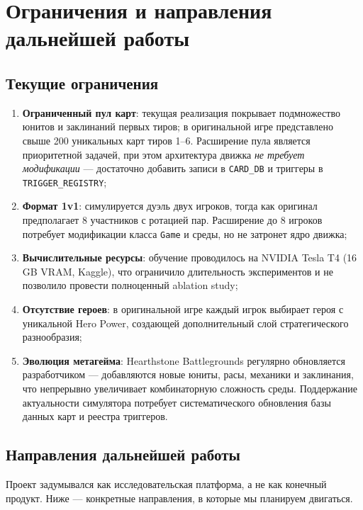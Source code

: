 \documentclass[a4paper,12pt]{extarticle}
\begin{document}
\newpage

\section{Ограничения и направления дальнейшей работы}

\subsection{Текущие ограничения}

\begin{enumerate}[noitemsep]
  \item \textbf{Ограниченный пул карт}: текущая реализация покрывает подмножество юнитов и заклинаний первых тиров; в оригинальной игре представлено свыше 200 уникальных карт тиров 1--6. Расширение пула является приоритетной задачей, при этом архитектура движка \emph{не требует модификации} --- достаточно добавить записи в \texttt{CARD\_DB} и триггеры в \texttt{TRIGGER\_REGISTRY};
  \item \textbf{Формат 1v1}: симулируется дуэль двух игроков, тогда как оригинал предполагает 8 участников с ротацией пар. Расширение до 8 игроков потребует модификации класса \texttt{Game} и среды, но не затронет ядро движка;
  \item \textbf{Вычислительные ресурсы}: обучение проводилось на NVIDIA Tesla T4 (16 GB VRAM, Kaggle), что ограничило длительность экспериментов и не позволило провести полноценный ablation study;
  \item \textbf{Отсутствие героев}: в оригинальной игре каждый игрок выбирает героя с уникальной Hero Power, создающей дополнительный слой стратегического разнообразия;
  \item \textbf{Эволюция метагейма}: Hearthstone Battlegrounds регулярно обновляется разработчиком --- добавляются новые юниты, расы, механики и заклинания, что непрерывно увеличивает комбинаторную сложность среды. Поддержание актуальности симулятора потребует систематического обновления базы данных карт и реестра триггеров.
\end{enumerate}

\subsection{Направления дальнейшей работы}

Проект задумывался как исследовательская платформа, а не как конечный продукт. Ниже --- конкретные направления, в которые мы планируем двигаться.
\end{document}
